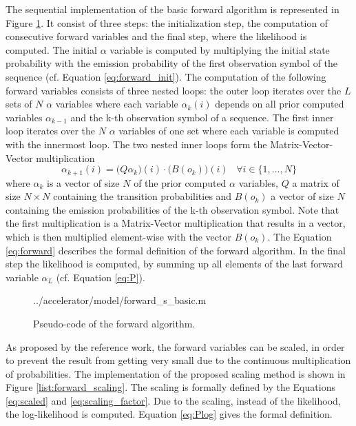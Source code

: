 \documentclass[mscthesis]{usiinfthesis}
\begin{document}
The sequential implementation of the basic forward algorithm is represented in
Figure \ref{list:forward_basic}. It consist of three steps: the initialization
step, the computation of consecutive forward variables and the final step,
where the likelihood is computed. The initial $ \alpha $ variable is computed
by multiplying the initial state probability with the emission probability of
the first observation symbol of the sequence (cf. Equation
\ref{eq:forward_init}). The computation of the following forward variables
consists of three nested loops: the outer loop iterates over the $ L $ sets of
$ N $ $ \alpha $ variables where each variable $\alpha_k(i)$ depends on all
prior computed variables $\alpha_{k-1}$ and the k-th observation symbol of
a sequence. The first inner loop iterates over the $ N $ $ \alpha $ variables
of one set where each variable is computed with the innermost loop. The two
nested inner loops form the Matrix-Vector-Vector multiplication
\begin{equation}
    \label{eq:mvv}
    \alpha_{k+1}(i) = \big(Q \alpha_k\big)(i) \cdot \big(B(o_k)\big)(i) \;\;\;
        \forall i \in \{1, \dots, N\}
\end{equation}
where $ \alpha_k $ is a vector of size $ N $ of the prior computed $ \alpha
$ variables, $ Q $ a matrix of size $ N \times N $ containing the transition
probabilities and $ B(o_k) $ a vector of size $ N $ containing the emission
probabilities of the k-th observation symbol. Note that the first
multiplication is a Matrix-Vector multiplication that results in a vector,
which is then multiplied element-wise with the vector $ B(o_k) $. The Equation
\ref{eq:forward} describes the formal definition of the forward algorithm. In
the final step the likelihood is computed, by summing up all elements of the
last forward variable $ \alpha_L $ (cf. Equation \ref{eq:P}).

\begin{figure}
    \centering
    
        {../accelerator/model/forward_s_basic.m}
    \caption{Pseudo-code of the forward algorithm.}
    \label{list:forward_basic}
\end{figure}

As proposed by the reference work, the forward variables can be scaled, in
order to prevent the result from getting very small due to the continuous
multiplication of probabilities. The implementation of the proposed scaling
method is shown in Figure \ref{list:forward_scaling}. The scaling is formally
defined by the Equations \ref{eq:scaled} and \ref{eq:scaling_factor}. Due to the
scaling, instead of the likelihood, the log-likelihood is computed. Equation
\ref{eq:Plog} gives the formal definition.
\end{document}
